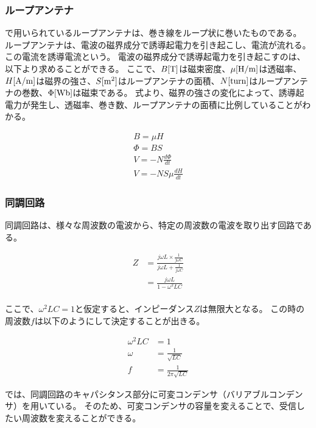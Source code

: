 \documentclass[report.tex]{subfiles}
\begin{document}
\subsubsection{ループアンテナ}

で用いられているループアンテナは、巻き線をループ状に巻いたものである。
ループアンテナは、電波の磁界成分で誘導起電力を引き起こし、電流が流れる。
この電流を誘導電流という。
電波の磁界成分で誘導起電力を引き起こすのは、以下より求めることができる。
ここで、\(B[\rm{T}]\)は磁束密度、\(\mu[\rm{H/m}]\)は透磁率、\(H[\rm{A/m}]\)は磁界の強さ、\(S[\rm{m^2}]\)はループアンテナの面積、\(N[\rm{turn}]\)はループアンテナの巻数、\(\Phi[\rm{Wb}]\)は磁束である。
式より、磁界の強さの変化によって、誘導起電力が発生し、透磁率、巻き数、ループアンテナの面積に比例していることがわかる。

\begin{align}
	B = \mu H               \\
	\Phi = B S              \\ %
	V = -N \frac{d\Phi}{dt} \\
	V = -N S \mu \frac{dH}{dt}
\end{align}

\subsubsection{同調回路}

同調回路は、様々な周波数の電波から、特定の周波数の電波を取り出す回路である。

\begin{align}
	Z & = \frac{j \omega L \times \frac{1}{j \omega C}}{j \omega L + \frac{1}{j \omega C}} \\
	  & = \frac{j \omega L}{1 - \omega^2 LC}                                               \\
\end{align}

ここで、$\omega^2 LC = 1$と仮定すると、インピーダンス\(Z\)は無限大となる。
この時の周波数\(f\)は以下のようにして決定することが出きる。

\begin{align}
	\omega^2 LC & = 1                         \\
	\omega      & = \frac{1}{\sqrt{LC}}       \\
	f           & = \frac{1}{2 \pi \sqrt{LC}}
\end{align}

では、同調回路のキャパシタンス部分に可変コンデンサ（バリアブルコンデンサ）を用いている。
そのため、可変コンデンサの容量を変えることで、受信したい周波数を変えることができる。
\end{document}
